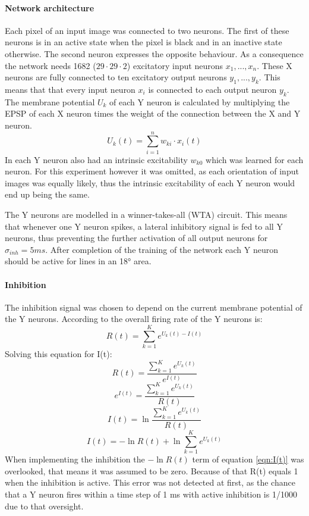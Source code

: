 \paragraph{Network architecture}
Each pixel of an input image was connected to two neurons. The first of these neurons is in an active state when the pixel is black and in an inactive state otherwise. The second neuron expresses the opposite behaviour. As a consequence the network needs 1682 ($29 \cdot 29 \cdot 2$) excitatory input neurons $x_1,...,x_n$. These X neurons are fully connected to ten excitatory output neurons $y_1,...,y_k$. This means that that every input neuron $x_i$ is connected to each output neuron $y_k$. The membrane potential $U_k$ of each Y neuron is calculated by multiplying the EPSP of each X neuron times the weight of the connection between the X and Y neuron. 
\begin{equation}
\label{eqn:uk}
U_k(t) = \sum_{i=1}^n w_{ki} \cdot x_i(t)
\end{equation}
In \citet{nessler} each Y neuron also had an intrinsic excitability $w_{k0}$ which was learned for each neuron. For this experiment however it was omitted, as each orientation of input images was equally likely, thus the intrinsic excitability of each Y neuron would end up being the same.

The Y neurons are modelled in a winner-takes-all (WTA) circuit. This means that whenever one Y neuron spikes, a lateral inhibitory signal is fed to all Y neurons, thus preventing the further activation of all output neurons for $\sigma_{inh} = 5 ms$. After completion of the training of the network each Y neuron should be active for lines in an 18° area. 


\paragraph{Inhibition}
The inhibition signal was chosen to depend on the current membrane potential of the Y neurons. According to \citet{nessler} the overall firing rate of the Y neurons is:
\begin{equation}
\label{eqn:R}
R(t) = \sum_{k=1}^K e^{U_k(t) - I(t)}
\end{equation}
Solving this equation for I(t):
\begin{equation}
\label{}
R(t) = \frac{ \sum_{k=1}^K e^{U_k(t)}}{e^{I(t)}}
\end{equation}
\begin{equation}
\label{}
e^{I(t)} = \frac{\sum_{k=1}^K e^{U_k(t)}}{R(t)}
\end{equation}
\begin{equation}
\label{}
I(t) = \ln{ \frac{ \sum_{k=1}^K e^{U_k(t)}}{R(t)}}
\end{equation}
\begin{equation}
\label{eqn:I(t)}
I(t) =  - \ln{R(t)} + \ln{  \sum_{k=1}^K e^{U_k(t)}}
\end{equation}
When implementing the inhibition the $- \ln{R(t)}$ term of equation \ref{eqn:I(t)} was overlooked, that means it was assumed to be zero. Because of that R(t) equals 1 when the inhibition is active. This error was not detected at first, as the chance that a Y neuron fires within a time step of 1 ms with active inhibition is 1/1000 due to that oversight.


